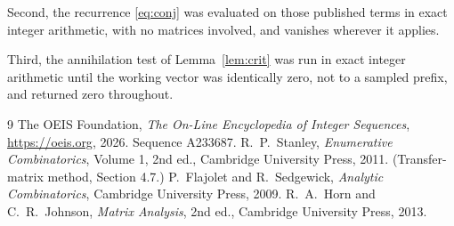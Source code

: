 \documentclass[11pt,a4paper]{article}
\theoremstyle{plain}
\theoremstyle{definition}
\begin{document}
Second, the recurrence \eqref{eq:conj} was evaluated on those published terms in exact
integer arithmetic, with no matrices involved, and vanishes wherever it applies.

Third, the annihilation test of Lemma~\ref{lem:crit} was run in exact integer arithmetic
until the working vector was identically zero, not to a sampled prefix, and returned zero
throughout.

\begin{thebibliography}{9}
 The OEIS Foundation, \emph{The On-Line Encyclopedia of Integer
Sequences}, \url{https://oeis.org}, 2026. Sequence A233687.
 R.~P.~Stanley, \emph{Enumerative Combinatorics}, Volume 1, 2nd ed.,
Cambridge University Press, 2011. (Transfer-matrix method, Section 4.7.)
 P.~Flajolet and R.~Sedgewick, \emph{Analytic Combinatorics}, Cambridge
University Press, 2009.
 R.~A.~Horn and C.~R.~Johnson, \emph{Matrix Analysis}, 2nd ed., Cambridge
University Press, 2013.
\end{thebibliography}
\end{document}
